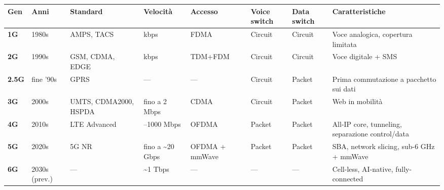 \documentclass[
  italian,
  openany]{book}
\newcounter{none} %
\begin{document}
{\def\LTcaptype{none} %
\begin{longtable}[]{@{}
  >{\raggedright\arraybackslash}p{}
  >{\raggedright\arraybackslash}p{}
  >{\raggedright\arraybackslash}p{}
  >{\raggedright\arraybackslash}p{}
  >{\raggedright\arraybackslash}p{}
  >{\raggedright\arraybackslash}p{}
  >{\raggedright\arraybackslash}p{}
  >{\raggedright\arraybackslash}p{}@{}}
\toprule\noalign{}
\begin{minipage}[b]{\linewidth}\raggedright
Gen
\end{minipage} & \begin{minipage}[b]{\linewidth}\raggedright
Anni
\end{minipage} & \begin{minipage}[b]{\linewidth}\raggedright
Standard
\end{minipage} & \begin{minipage}[b]{\linewidth}\raggedright
Velocità
\end{minipage} & \begin{minipage}[b]{\linewidth}\raggedright
Accesso
\end{minipage} & \begin{minipage}[b]{\linewidth}\raggedright
Voice switch
\end{minipage} & \begin{minipage}[b]{\linewidth}\raggedright
Data switch
\end{minipage} & \begin{minipage}[b]{\linewidth}\raggedright
Caratteristiche
\end{minipage} \\
\midrule\noalign{}
\endhead
\bottomrule\noalign{}
\endlastfoot
\textbf{1G} & 1980s & AMPS, TACS & 2.4 kbps & FDMA & Circuit & Circuit &
Voce analogica, copertura limitata \\
\textbf{2G} & 1990s & GSM, CDMA, EDGE & 64 kbps & TDM+FDM & Circuit &
Circuit & Voce digitale + SMS \\
\textbf{2.5G} & fine '90s & GPRS & --- & --- & Circuit & Packet & Prima
commutazione a pacchetto sui dati \\
\textbf{3G} & 2000s & UMTS, CDMA2000, HSPDA & fino a 2 Mbps & CDMA &
Circuit & Packet & Web in mobilità \\
\textbf{4G} & 2010s & LTE Advanced & 100--1000 Mbps & OFDMA & Packet &
Packet & All-IP core, tunneling, separazione control/data \\
\textbf{5G} & 2020s & 5G NR & fino a \textasciitilde20 Gbps & OFDMA +
mmWave & Packet & Packet & SBA, network slicing, sub-6 GHz + mmWave \\
\textbf{6G} & 2030s (prev.) & --- & \textasciitilde1 Tbps & --- & --- &
--- & Cell-less, AI-native, fully-connected \\
\end{longtable}
}
\end{document}

